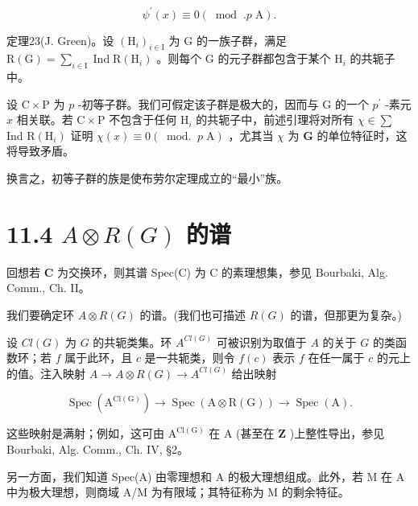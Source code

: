\documentclass[10pt]{article}
\begin{document}
\[
{\psi }^{\prime }\left( x\right)  \equiv  0\left( {{\;\operatorname{mod}\;.}p\mathrm{\;A}}\right) .
\]

定理23(J. Green)。设 \({\left( {\mathrm{H}}_{i}\right) }_{i \in  \mathrm{I}}\) 为 \(\mathrm{G}\) 的一族子群，满足 \(\mathrm{R}\left( \mathrm{G}\right)  = \mathop{\sum }\limits_{{i \in  \mathrm{I}}}\operatorname{Ind}\mathrm{R}\left( {\mathrm{H}}_{i}\right)\) 。则每个 \(\mathrm{G}\) 的元子群都包含于某个 \({\mathrm{H}}_{i}\) 的共轭子中。

设 \(\mathrm{C} \times  \mathrm{P}\) 为 \(p\) -初等子群。我们可假定该子群是极大的，因而与 \(\mathrm{G}\) 的一个 \({p}^{\prime }\) -素元 \(x\) 相关联。若 \(\mathrm{C} \times  \mathrm{P}\) 不包含于任何 \({\mathrm{H}}_{i}\) 的共轭子中，前述引理将对所有 \(\chi  \in  \sum\) Ind \(\mathrm{R}\left( {\mathrm{H}}_{i}\right)\) 证明 \(\chi \left( x\right)  \equiv  0\left( {{\;\operatorname{mod.}\;}p\mathrm{\;A}}\right)\) ，尤其当 \(\chi\) 为 \(\mathbf{G}\) 的单位特征时，这将导致矛盾。

换言之，初等子群的族是使布劳尔定理成立的“最小”族。

\section*{11.4 \(A \otimes  R\left( G\right)\) 的谱}

回想若 \(\mathbf{C}\) 为交换环，则其谱 Spec(C) 为 C 的素理想集，参见 Bourbaki, Alg. Comm., Ch. II。

我们要确定环 \(A \otimes  R\left( G\right)\) 的谱。(我们也可描述 \(R\left( G\right)\) 的谱，但那更为复杂。)

设 \({Cl}\left( G\right)\) 为 \(G\) 的共轭类集。环 \({A}^{{Cl}\left( G\right) }\) 可被识别为取值于 \(A\) 的关于 \(G\) 的类函数环；若 \(f\) 属于此环，且 \(c\) 是一共轭类，则令 \(f\left( c\right)\) 表示 \(f\) 在任一属于 \(c\) 的元上的值。注入映射 \(A \rightarrow  A \otimes  R\left( G\right)  \rightarrow  {A}^{{Cl}\left( G\right) }\) 给出映射

\[
\operatorname{Spec}\left( {\mathrm{A}}^{\mathrm{{Cl}}\left( \mathrm{G}\right) }\right)  \rightarrow  \operatorname{Spec}\left( {\mathrm{A} \otimes  \mathrm{R}\left( \mathrm{G}\right) }\right)  \rightarrow  \operatorname{Spec}\left( \mathrm{A}\right) .
\]

这些映射是满射；例如，这可由 \({\mathrm{A}}^{\mathrm{{Cl}}\left( \mathrm{G}\right) }\) 在 \(\mathrm{A}\) (甚至在 \(\mathbf{Z}\) )上整性导出，参见 Bourbaki, Alg. Comm., Ch. IV, §2。

另一方面，我们知道 Spec(A) 由零理想和 A 的极大理想组成。此外，若 M 在 A 中为极大理想，则商域 A/M 为有限域；其特征称为 M 的剩余特征。
\end{document}
